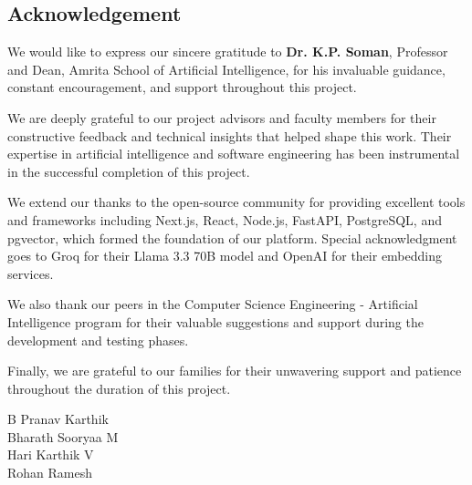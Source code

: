\documentclass[12pt]{report}
\begin{document}
\newpage
\baselineskip 1cm
\tableofcontents %
\newpage

\begin{center}
    \section*{Acknowledgement}
\end{center}

We would like to express our sincere gratitude to \textbf{Dr. K.P. Soman}, Professor and Dean, Amrita School of Artificial Intelligence, for his invaluable guidance, constant encouragement, and support throughout this project.

We are deeply grateful to our project advisors and faculty members for their constructive feedback and technical insights that helped shape this work. Their expertise in artificial intelligence and software engineering has been instrumental in the successful completion of this project.

We extend our thanks to the open-source community for providing excellent tools and frameworks including Next.js, React, Node.js, FastAPI, PostgreSQL, and pgvector, which formed the foundation of our platform. Special acknowledgment goes to Groq for their Llama 3.3 70B model and OpenAI for their embedding services.

We also thank our peers in the Computer Science Engineering - Artificial Intelligence program for their valuable suggestions and support during the development and testing phases.

Finally, we are grateful to our families for their unwavering support and patience throughout the duration of this project.

\vspace{1cm}
\noindent B Pranav Karthik\\
Bharath Sooryaa M\\
Hari Karthik V\\
Rohan Ramesh

\cleardoublepage
{}
\listoffigures %

\cleardoublepage
{}
\listoftables %
\clearpage

\end{document}
